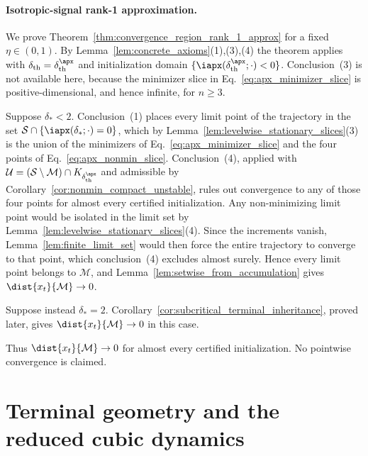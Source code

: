 \documentclass{article}
\begin{document}
\paragraph{Isotropic-signal rank-1 approximation.}
We prove Theorem~\ref{thm:convergence_region_rank_1_approx} for a fixed
$\eta\in(0,1)$. By Lemma~\ref{lem:concrete_axioms}(1),(3),(4) the theorem
applies with $\delta_{\mathrm{th}}=\delta_\mathrm{th}^\apx$ and initialization
domain $\{\iapx(\delta_\mathrm{th}^\apx;\cdot)<0\}$. Conclusion~(3) is not
available here, because the minimizer slice
in Eq.~\eqref{eq:apx_minimizer_slice} is positive-dimensional, and hence
infinite, for $n\ge3$.

Suppose $\delta_\ast<2$. Conclusion~(1) places every limit point of the
trajectory in the set
$\mathcal S\cap\{\iapx(\delta_\ast;\cdot)=0\}$, which by
Lemma~\ref{lem:levelwise_stationary_slices}(3) is the union of the
minimizers of Eq.~\eqref{eq:apx_minimizer_slice} and the four points of
Eq.~\eqref{eq:apx_nonmin_slice}. Conclusion~(4), applied with
$\mathcal U=(\mathcal S\setminus\mathcal M)\cap K_{\delta_\mathrm{th}^\apx}$
and admissible by Corollary~\ref{cor:nonmin_compact_unstable}, rules out
convergence to any of those four points for almost every certified
initialization. Any non-minimizing limit point would be isolated in the limit
set by Lemma~\ref{lem:levelwise_stationary_slices}(4). Since the increments
vanish, Lemma~\ref{lem:finite_limit_set} would then force the entire trajectory
to converge to that point, which conclusion~(4) excludes almost surely. Hence
every limit point belongs to $\mathcal M$, and
Lemma~\ref{lem:setwise_from_accumulation} gives $\dist{x_t}{\mathcal M}\to0$.

Suppose instead $\delta_\ast=2$. Corollary~\ref{cor:subcritical_terminal_inheritance},
proved later, gives $\dist{x_t}{\mathcal M}\to0$ in this case.

Thus $\dist{x_t}{\mathcal M}\to0$ for almost every certified initialization.
No pointwise convergence is claimed.


\section{Terminal geometry and the reduced cubic dynamics}
\label{sec:convergence when delta_* = 2}
\end{document}

